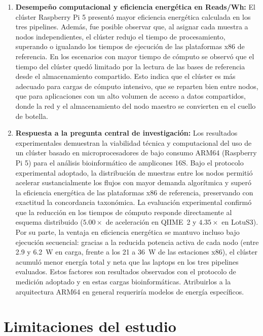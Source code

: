 \documentclass[12pt,oneside,spanish]{book}
\begin{document}
\begin{enumerate}
        \item \textbf{Desempeño computacional y eficiencia energética en Reads/Wh:} El clúster Raspberry Pi 5 presentó mayor eficiencia energética calculada en los tres pipelines. Además, fue posible observar que, al asignar cada muestra a nodos independientes, el clúster redujo el tiempo de procesamiento, superando o igualando los tiempos de ejecución de las plataformas x86 de referencia. En los escenarios con mayor tiempo de cómputo se observó que el tiempo del clúster quedó limitado por la lectura de las bases de referencia desde el almacenamiento compartido. Esto indica que el clúster es más adecuado para cargas de cómputo intensivo, que se reparten bien entre nodos, que para aplicaciones con un alto volumen de acceso a datos compartidos, donde la red y el almacenamiento del nodo maestro se convierten en el cuello de botella.
    
        \item \textbf{Respuesta a la pregunta central de investigación:} Los resultados experimentales demuestran la viabilidad técnica y computacional del uso de un clúster basado en microprocesadores de bajo consumo ARM64 (Raspberry Pi 5) para el análisis bioinformático de amplicones 16S. Bajo el protocolo experimental adoptado, la distribución de muestras entre los nodos permitió acelerar sustancialmente los flujos con mayor demanda algorítmica y superó la eficiencia energética de las plataformas x86 de referencia, preservando con exactitud la concordancia taxonómica. La evaluación experimental confirmó que la reducción en los tiempos de cómputo responde directamente al esquema distribuido ($5.00\times$ de aceleración en QIIME~2 y $4.35\times$ en LotuS3). Por su parte, la ventaja en eficiencia energética se mantuvo incluso bajo ejecución secuencial: gracias a la reducida potencia activa de cada nodo (entre 2.9 y 6.2~W en carga, frente a los 21 a 36~W de las estaciones x86), el clúster acumuló menor energía total y neta que las laptops en los tres pipelines evaluados. Estos factores son resultados observados con el protocolo de medición adoptado y en estas cargas bioinformáticas. Atribuirlos a la arquitectura ARM64 en general requeriría modelos de energía específicos.
        
    \end{enumerate}
    
    \section{Limitaciones del estudio}
\end{document}
